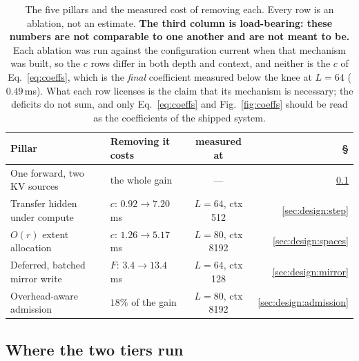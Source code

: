 \begin{table}[t]
\centering
\small
\begin{tabular}{llcr}
\toprule
Pillar & Removing it costs & measured at & \S \\
\midrule
One forward, two KV sources & the whole gain & --- & \ref{sec:design:exec} \\
Transfer hidden under compute & $c$: $0.92 \to 7.20$\,ms & $L{=}64$, ctx 512 & \ref{sec:design:step} \\
$O(r)$ extent allocation & $c$: $1.26 \to 5.17$\,ms & $L{=}80$, ctx 8192 & \ref{sec:design:spaces} \\
Deferred, batched mirror write & $F$: $3.4 \to 13.4$\,ms & $L{=}64$, ctx 128 & \ref{sec:design:mirror} \\
Overhead-aware admission & $18\%$ of the gain & $L{=}80$, ctx 8192 & \ref{sec:design:admission} \\
\bottomrule
\end{tabular}
\caption{The five pillars and the measured cost of removing each. Every row is an
ablation, not an estimate. \textbf{The third column is load-bearing: these numbers
are not comparable to one another and are not meant to be.} Each ablation was run
against the configuration current when that mechanism was built, so the $c$ rows
differ in both depth and context, and neither is the $c$ of Eq.~\ref{eq:coeffs},
which is the \emph{final} coefficient measured below the knee at $L{=}64$
($0.49$\,ms). What each row licenses is the claim that its mechanism is necessary;
the deficits do not sum, and only Eq.~\ref{eq:coeffs} and
Fig.~\ref{fig:coeffs} should be read as the coefficients of the shipped system.}
\label{tab:pillars}
\end{table}

\subsection{Where the two tiers run}
\label{sec:design:exec}



